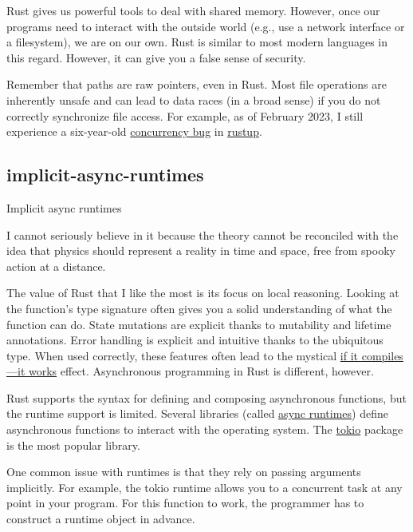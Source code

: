 \documentclass{article}
\begin{document}
Rust gives us powerful tools to deal with shared memory.
However, once our programs need to interact with the outside world (e.g., use a network interface or a filesystem), we are on our own.
Rust is similar to most modern languages in this regard.
However, it can give you a false sense of security.

Remember that paths are raw pointers, even in Rust.
Most file operations are inherently unsafe and can lead to data races (in a broad sense) if you do not correctly synchronize file access.
For example, as of February 2023, I still experience a six-year-old \href{https://github.com/rust-lang/rustup/issues/988}{concurrency bug} in \href{https://rustup.rs/}{rustup}.

\subsection{implicit-async-runtimes}{Implicit async runtimes}
\epigraph{
    I cannot seriously believe in it because the theory cannot be reconciled with the idea that physics should represent a reality in time and space, free from spooky action at a distance.
}{}

The value of Rust that I like the most is its focus on local reasoning.
Looking at the function's type signature often gives you a solid understanding of what the function can do.
State mutations are explicit thanks to mutability and lifetime annotations.
Error handling is explicit and intuitive thanks to the ubiquitous  type.
When used correctly, these features often lead to the mystical \href{https://wiki.haskell.org/Why_Haskell_just_works}{if it compiles---it works} effect.
Asynchronous programming in Rust is different, however.

Rust supports the \href{https://rust-lang.github.io/async-book/01_getting_started/04_async_await_primer.html}{} syntax for defining and composing asynchronous functions, but the runtime support is limited.
Several libraries (called \href{https://ncameron.org/blog/what-is-an-async-runtime/}{async runtimes}) define asynchronous functions to interact with the operating system.
The \href{https://crates.io/crates/tokio}{tokio} package is the most popular library.

One common issue with runtimes is that they rely on passing arguments implicitly.
For example, the tokio runtime allows you to \href{https://docs.rs/tokio/latest/tokio/fn.spawn.html}{} a concurrent task at any point in your program.
For this function to work, the programmer has to construct a runtime object in advance.
\end{document}
